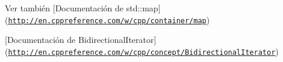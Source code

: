 \begin{DoxySeeAlso}{\-Ver también}
\mbox{[}\-Documentación de std\-::map\mbox{]}(\href{http://en.cppreference.com/w/cpp/container/map}{\tt http\-://en.\-cppreference.\-com/w/cpp/container/map})\par
 \mbox{[}\-Documentación de \-Bidirectional\-Iterator\mbox{]}(\href{http://en.cppreference.com/w/cpp/concept/BidirectionalIterator}{\tt http\-://en.\-cppreference.\-com/w/cpp/concept/\-Bidirectional\-Iterator}) 
\end{DoxySeeAlso}
